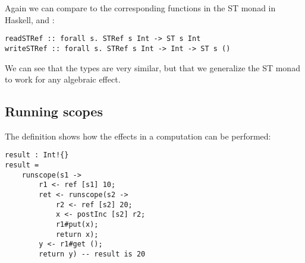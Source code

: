 Again we can compare to the corresponding functions in the ST monad in Haskell,  and :

\begin{verbatim}
readSTRef :: forall s. STRef s Int -> ST s Int
writeSTRef :: forall s. STRef s Int -> Int -> ST s ()
\end{verbatim}

We can see that the types are very similar, but that we generalize the ST monad to work for any algebraic effect.

\subsection{Running scopes}
The definition  shows how the effects in a computation can be performed:

\begin{verbatim}
result : Int!{}
result =
	runscope(s1 ->
		r1 <- ref [s1] 10;
		ret <- runscope(s2 ->
			r2 <- ref [s2] 20;
			x <- postInc [s2] r2;
			r1#put(x);
			return x);
		y <- r1#get ();
		return y) -- result is 20
\end{verbatim}


